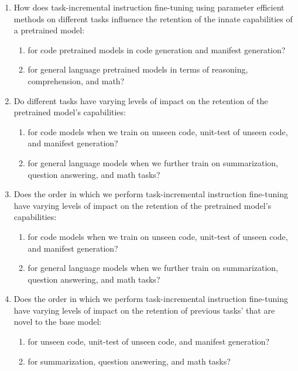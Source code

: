 \begin{enumerate}[label={RQ\arabic*.}, leftmargin=*]

\item How does task-incremental instruction fine-tuning using parameter efficient methods on different tasks influence the retention of the innate capabilities of a pretrained model:
    \begin{enumerate}[label={RQ1\alph*.}, leftmargin=*]
        \item for code pretrained models in code generation and manifest generation?
        \item for general language pretrained models in terms of reasoning, comprehension, and math?
    \end{enumerate}

\item Do different tasks have varying levels of impact on the retention of the pretrained model’s capabilities:
    \begin{enumerate}[label={RQ2\alph*.}, leftmargin=*]
        \item for code models when we train on unseen code, unit-test of unseen code, and manifest generation?
        \item for general language models when we further train on summarization, question answering, and math tasks?
    \end{enumerate}

\item Does the order in which we perform task-incremental instruction fine-tuning have varying levels of impact on the retention of the pretrained model’s capabilities: \label{RQ3}
    \begin{enumerate}[label={RQ3\alph*.}, leftmargin=*]
        \item for code models when we train on unseen code, unit-test of unseen code, and manifest generation? \label{RQ3a}
        \item for general language models when we further train on summarization, question answering, and math tasks? \label{RQ3b}
    \end{enumerate}

\item Does the order in which we perform task-incremental instruction fine-tuning have varying levels of impact on the retention of previous tasks' that are novel to the base model: \label{RQ4}
    \begin{enumerate}[label={RQ4\alph*.}, leftmargin=*]
        \item for unseen code, unit-test of unseen code, and manifest generation? \label{RQ4a}
        \item for summarization, question answering, and math tasks? \label{RQ4b}
    \end{enumerate}


\end{enumerate}
